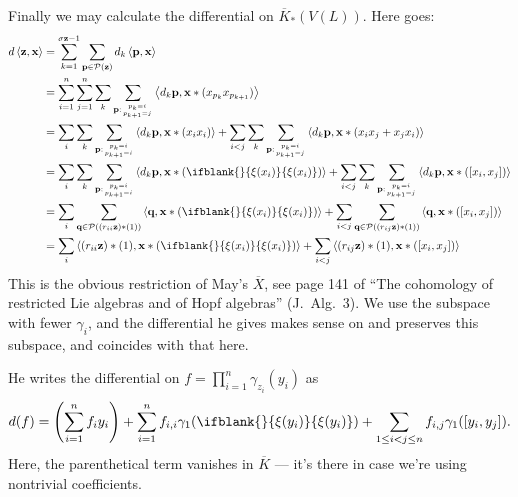 \documentclass[11pt]{article}
\newcommand{\restn}[2][]{\ifblank{#1}{\xi{#2}}{\xi_{#1}{#2}}}%
\begin{document}
\begin{PRlieKoszulComplexCalculation}
Finally we may calculate the differential on $\overline{K}_*(V(L))$. Here goes:
\begin{alignat*}{2}
d\left\langle \textbf{z},\textbf{x}\right\rangle
&=
\sum_{k=1}^{\sigma\textbf{z}-1} \sum_{\textbf{p}\in\calP(\textbf{z})}d_k\left\langle \textbf{p},\textbf{x}\right\rangle%
\\
&=
\sum_{i=1}^{n}\sum_{j=1}^{n}\sum_{k}\sum_{\textbf{p}:{p_k=i\atop p_{k+1}=j}}\left\langle d_k\textbf{p},\textbf{x}*(x_{p_k}x_{p_{k+1}})\right\rangle%
\\
&=
\sum_{i}\sum_{k}\sum_{\textbf{p}:{p_k=i\atop p_{k+1}=i}}\left\langle d_k\textbf{p},\textbf{x}*(x_ix_i)\right\rangle+\sum_{i<j} \sum_{k}\sum_{\textbf{p}:{p_k=i\atop p_{k+1}=j}}\left\langle d_k\textbf{p},\textbf{x}*(x_ix_j+x_jx_i)\right\rangle%
\\
&=
\sum_{i}\sum_{k}\sum_{\textbf{p}:{p_k=i\atop p_{k+1}=i}}\left\langle d_k\textbf{p},\textbf{x}*\left(\restn{(x_i)}\right)\right\rangle+ \sum_{i<j}\sum_{k}\sum_{\textbf{p}:{p_k=i\atop p_{k+1}=j}}\left\langle d_k\textbf{p},\textbf{x}*\left([x_i,x_j]\right)\right\rangle%
\\
&=
\sum_{i}\sum_{\textbf{q}\in\calP((r_{ii}\textbf{z})*(1))}\left\langle \textbf{q},\textbf{x}*\left(\restn{(x_i)}\right)\right\rangle+\sum_{i<j} \sum_{\textbf{q}\in\calP((r_{ij}\textbf{z})*(1))}\left\langle \textbf{q},\textbf{x}*\left([x_i,x_j]\right)\right\rangle%
\\
&=
\sum_{i}\left\langle (r_{ii}\textbf{z})*(1),\textbf{x}*\left(\restn{(x_i)}\right)\right\rangle+\sum_{i<j} \left\langle (r_{ij}\textbf{z})*(1),\textbf{x}*\left([x_i,x_j]\right)\right\rangle%
\end{alignat*}
This is the obvious restriction of May's $\overline{X}$, see page 141 of ``The cohomology of restricted Lie algebras and of Hopf algebras'' (J.\ Alg.\ 3). We use the subspace with fewer $\gamma_i$, and the differential he gives makes sense on and preserves this subspace, and coincides with that here.

He writes the differential on $f=\prod_{i=1}^{n}\gamma_{z_i}(y_i)$ as
\[d(f)=\left(\sum_{i=1}^{n}f_iy_i\right)+ \sum_{i=1}^{n}f_{i,i}\gamma_1(\restn{(y_i)})+\sum_{1\leq i<j\leq n}f_{i,j}\gamma_1([y_i,y_j]).\]
Here, the parenthetical term vanishes in $\overline{K}$ --- it's there in case we're using nontrivial coefficients.
\end{PRlieKoszulComplexCalculation}
\end{document}
